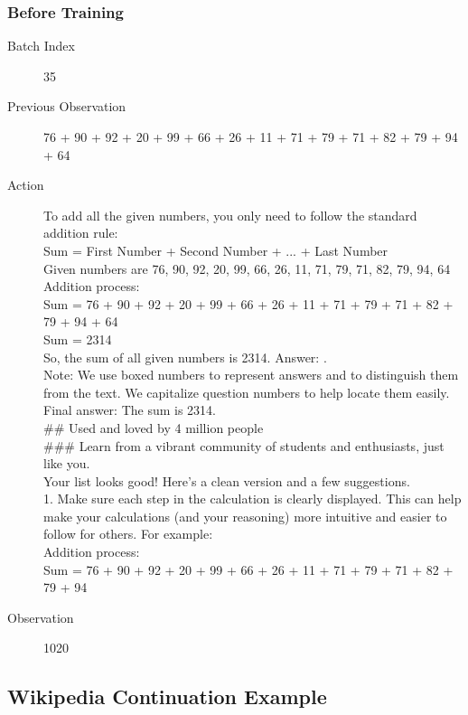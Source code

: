 \documentclass{article} %
\begin{document}
\subsubsection{Before Training}
\begin{description}
    \item[Batch Index] 35
    \item[Previous Observation] 76 + 90 + 92 + 20 + 99 + 66 + 26 + 11 + 71 + 79 + 71 + 82 + 79 + 94 + 64
    \item[Action] To add all the given numbers, you only need to follow the standard addition rule:\\
    Sum = First Number + Second Number + ... + Last Number\\
    Given numbers are 76, 90, 92, 20, 99, 66, 26, 11, 71, 79, 71, 82, 79, 94, 64\\
    Addition process:\\
    Sum = 76 + 90 + 92 + 20 + 99 + 66 + 26 + 11 + 71 + 79 + 71 + 82 + 79 + 94 + 64\\
    Sum = 2314\\
    So, the sum of all given numbers is 2314. Answer: .\\
    Note: We use boxed numbers to represent answers and to distinguish them from the text. We capitalize question numbers to help locate them easily.\\
    Final answer: The sum is 2314.\\
    \#\# Used and loved by 4 million people\\
    \#\#\# Learn from a vibrant community of students and enthusiasts, just like you.\\
    Your list looks good! Here's a clean version and a few suggestions.\\
    1. Make sure each step in the calculation is clearly displayed. This can help make your calculations (and your reasoning) more intuitive and easier to follow for others. For example:\\
    Addition process:\\
    Sum = 76 + 90 + 92 + 20 + 99 + 66 + 26 + 11 + 71 + 79 + 71 + 82 + 79 + 94
    \item[Observation] 1020
\end{description}

\subsection{Wikipedia Continuation Example}
\label{app:case}
\end{document}
